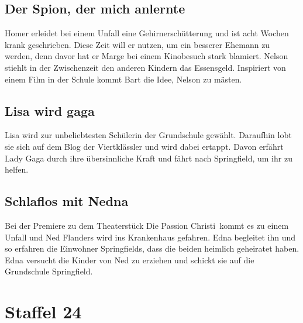 \subsection{Der Spion, der mich anlernte}
Homer erleidet bei einem Unfall eine Gehirnerschütterung und ist acht Wochen krank geschrieben. Diese Zeit will er nutzen, um ein besserer Ehemann zu werden, denn davor hat er Marge bei einem Kinobesuch stark blamiert. Nelson stiehlt in der Zwischenzeit den anderen Kindern das Essensgeld. Inspiriert von einem Film in der Schule kommt Bart die Idee, Nelson zu mästen.



\subsection{Lisa wird gaga}\label{PABF14}
Lisa wird zur unbeliebtesten Schülerin der Grundschule gewählt. Daraufhin lobt sie sich auf dem Blog der Viertklässler und wird dabei ertappt. Davon erfährt Lady Gaga durch ihre übersinnliche Kraft und fährt nach Springfield, um ihr zu helfen.

\subsection{Schlaflos mit Nedna}\label{PABF15}
Bei der Premiere zu dem Theaterstück \glqq Die Passion Christi\grqq\ kommt es zu einem Unfall und Ned Flanders wird ins Krankenhaus gefahren. Edna begleitet ihn und so erfahren die Einwohner Springfields, dass die beiden heimlich geheiratet haben. Edna versucht die Kinder von Ned zu erziehen und schickt sie auf die Grundschule Springfield. 



\section{Staffel 24}

